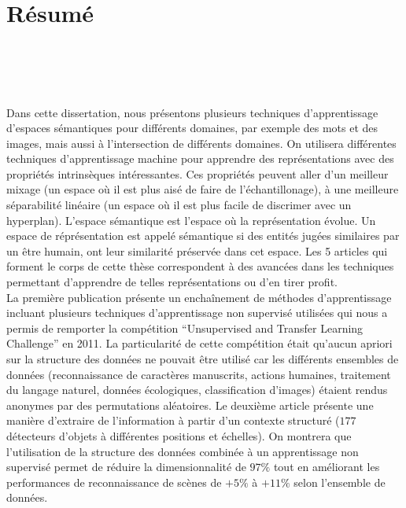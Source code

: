 \chapter*{R\'{e}sum\'{e}\\~~~~~~~~\\~~~~~~~~~~~}

\vspace{-2.8cm}

Dans cette dissertation, nous présentons plusieurs techniques d'apprentissage
d'espaces sémantiques pour différents domaines, par exemple des mots et des
images, mais aussi à l'intersection de différents domaines.  On utilisera
différentes techniques d'apprentissage machine pour apprendre des
représentations avec des propriétés intrinsèques intéressantes. Ces propriétés
peuvent aller d'un meilleur mixage (un espace où il est plus aisé de faire de
l'échantillonage), à une meilleure séparabilité linéaire (un espace où il est
plus facile de discrimer avec un hyperplan). L'espace sémantique est l'espace
où la représentation évolue. Un espace de réprésentation est appelé sémantique
si des entités jugées similaires par un être humain, ont leur similarité
préservée dans cet espace.  Les 5 articles qui forment le corps de cette thèse
correspondent à des avancées dans les techniques permettant d'apprendre de
telles représentations ou d'en tirer profit.  
\\

\vspace{-0.2cm}
La première publication présente un enchaînement de méthodes d'apprentissage
incluant plusieurs techniques d'apprentissage non supervisé utilisées qui nous a permis de
remporter la compétition ``Unsupervised and Transfer Learning Challenge'' en 2011. La particularité de cette compétition était
qu'aucun apriori sur la structure des données ne pouvait être utilisé car les
différents ensembles de données (reconnaissance de caractères manuscrits,
actions humaines, traitement du langage naturel, données écologiques,
classification d'images) étaient rendus anonymes par des permutations
aléatoires. Le deuxième article présente une manière d'extraire de l'information à
partir d'un contexte structuré ($177$ détecteurs d'objets à différentes
positions et échelles). On montrera que l'utilisation de la structure des
données combinée à un apprentissage non supervisé permet de réduire la
dimensionnalité de $97\%$ tout en améliorant les performances de
reconnaissance de scènes de $+5\%$ à $+11\%$ selon l'ensemble de données.
\\

